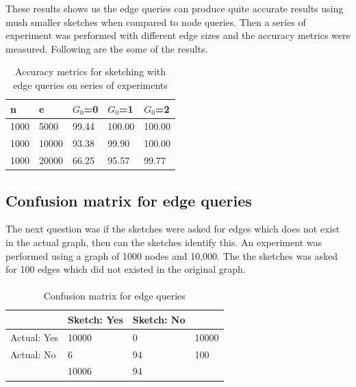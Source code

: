 \documentclass[12pt]{report}
\numberwithin{figure}{section}
\numberwithin{table}{section}
\begin{document}
These results shows us the edge queries can produce quite accurate results using mush smaller sketches when compared to node queries. Then a series of experiment was performed with different edge sizes and the accuracy metrics were measured. Following are the some of the results.  

\begin{table}[H]
\centering
\begin{tabular}{|l|l|l|l|l|}
\hline
n    & e     & $G_0$=0 & $G_0$=1 & $G_0$=2 \\ \hline
1000 & 5000  & 99.44   & 100.00  & 100.00  \\ \hline
1000 & 10000 & 93.38   & 99.90   & 100.00  \\ \hline
1000 & 20000 & 66.25   & 95.57   & 99.77   \\ \hline
\end{tabular}
\caption{Accuracy metrics for sketching with edge queries on series of experiments}
\end{table}

\subsection{Confusion matrix for edge queries}

The next question was if the sketches were asked for edges which does not exist in the actual graph, then can the sketches identify this. An experiment was performed using a graph of 1000 nodes and 10,000. The the sketches was asked for 100 edges which did not existed in the original graph. 

\paragraph{}

\begin{table}[H]
\centering
\begin{tabular}{l|l|l|l}
\cline{2-3}
                                  & Sketch: Yes & Sketch: No &                            \\ \hline
\multicolumn{1}{|l|}{Actual: Yes} & 10000       & 0          & \multicolumn{1}{l|}{10000} \\ \hline
\multicolumn{1}{|l|}{Actual: No}  & 6          & 94        & \multicolumn{1}{l|}{100}  \\ \hline
                                  & 10006       & 94        &                            \\ \cline{2-3}
\end{tabular}
\caption{Confusion matrix for edge queries}
\end{table}
\end{document}
